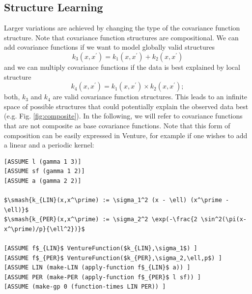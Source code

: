 \documentclass{article} %
\begin{document}
\subsection{Structure Learning}

Larger variations are achieved by changing the type of the covariance function structure. 
Note that covariance function structures are compositional. We can add covariance functions if we want to model globally valid structures
\begin{equation}
k_3(x,x^\prime) = k_1(x,x^\prime) + k_2(x,x^\prime)
\end{equation}
 and we can multiply covariance functions if the data is best explained by local structure 
\begin{equation}
k_4(x,x^\prime) = k_1(x,x^\prime) \times k_2(x,x^\prime);
\end{equation}
both, $k_3$ and $k_4$ are valid covariance function structures. This leads to an infinite space of possible structures that could potentially explain the observed data best (e.g. Fig. \ref{fig:composite}). In the following, we will refer to covariance functions that are not composite as base covariance functions. Note that this form of composition can be easily expressed in Venture, for example if one wishes to add a linear and a periodic kernel:

\begin{minipage}{\linewidth}
\scriptsize
\begin{lstlisting}[frame=single,label=alg:gpNeal,caption=LIN $\times$ PER,mathescape]
[ASSUME l (gamma 1 3)]
[ASSUME sf (gamma 1 2)]
[ASSUME a (gamma 2 2)]

$\smash{k_{LIN}(x,x^\prime) := \sigma_1^2 (x - \ell) (x^\prime - \ell)}$
$\smash{k_{PER}(x,x^\prime) := \sigma_2^2 \exp(-\frac{2 \sin^2(\pi(x-x^\prime)/p}{\ell^2})}$

[ASSUME f$_{LIN}$ VentureFunction($k_{LIN},\sigma_1$) ]
[ASSUME f$_{PER}$ VentureFunction($k_{PER},\sigma_2,\ell,p$) ]
[ASSUME LIN (make-LIN (apply-function f$_{LIN}$ a)) ]
[ASSUME PER (make-PER (apply-function f$_{PER}$ l sf)) ]
[ASSUME (make-gp 0 (function-times LIN PER)) ]
\end{lstlisting}

\end{minipage}
\end{document}
